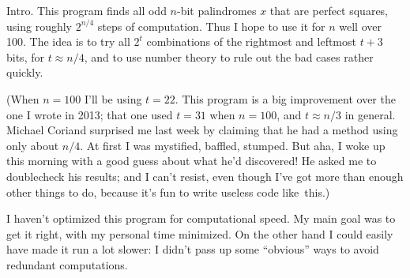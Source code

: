 
\let\mod=\bmod


Intro. This program finds all odd $n$-bit palindromes $x$ that are
perfect
squares, using roughly $2^{n/4}$ steps of computation. Thus I hope to use it
for $n$ well over 100.
The idea is to try all $2^t$ combinations of the rightmost and leftmost
$t+3$ bits, for $t\approx n/4$, and to use number theory to rule out
the bad cases rather quickly.

(When $n=100$ I'll be using $t=22$.
This program is a big improvement over the one I wrote in 2013;
that one used $t=31$ when $n=100$, and $t\approx n/3$ in general.
Michael Coriand surprised me last week by claiming that he had a method
using only about $n/4$. At first I was mystified, baffled, stumped. But
aha, I woke up this morning with a good guess about what he'd discovered!
He asked me to doublecheck his results; and
I can't resist, even though I've got more than enough other things to do,
because it's fun to write useless code like~this.)

I haven't optimized this program for computational speed. My main goal was to
get it right, with my personal time minimized.
On the other hand I could easily have made it run a lot slower:
I didn't pass up some ``obvious'' ways to avoid redundant computations.

